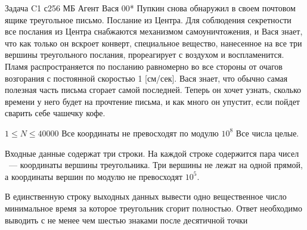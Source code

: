 \begin{problem}{Задача C}{1 с}{256 МБ}
Агент Вася 00* Пупкин снова обнаружил в своем почтовом ящике треугольное
письмо. Послание из Центра. Для соблюдения секретности все послания из Центра
снабжаются механизмом самоуничтожения, и Вася знает, что как только он вскроет
конверт, специальное вещество, нанесенное на все три вершины треугольного послания,
прореагирует с воздухом и воспламенится.
Пламя распространяется по посланию равномерно во все стороны от очагов
возгорания с постоянной скоростью 1 [см/сек]. Вася знает, что обычно самая полезная
часть письма сгорает самой последней. Теперь он хочет узнать, сколько времени у него
будет на прочтение письма, и как много он упустит, если пойдет сварить себе чашечку
кофе.\\
\Limit

$1 \le N \le 40000$
Все координаты не превосходят по модулю $10^8$
Все числа целые.

\InputFile
Входные данные содержат три строки. На каждой строке содержится пара чисел
~--- координаты вершины треугольника. Три вершины не лежат на одной прямой, а
координаты вершин по модулю не превосходят $10^5$.

\OutputFile
В единственную строку выходных данных вывести одно вещественное число
минимальное время за которое треугольник сгорит полностью. Ответ необходимо
выводить с не менее чем шестью знаками после десятичной точки

\Example
\begin{example}
\end{example}
\end{problem}
